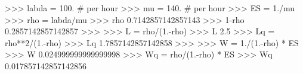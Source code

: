 
>>> labda = 100. # per hour
>>> mu = 140. # per hour
>>> ES = 1./mu
>>> rho = labda/mu
>>> rho
0.7142857142857143
>>> 1-rho
0.2857142857142857
>>>
>>> L = rho/(1.-rho)
>>> L
2.5
>>> Lq = rho**2/(1.-rho)
>>> Lq
1.7857142857142858
>>>
>>> W = 1./(1.-rho) * ES
>>> W
0.024999999999999998
>>> Wq = rho/(1.-rho) * ES
>>> Wq
0.017857142857142856

